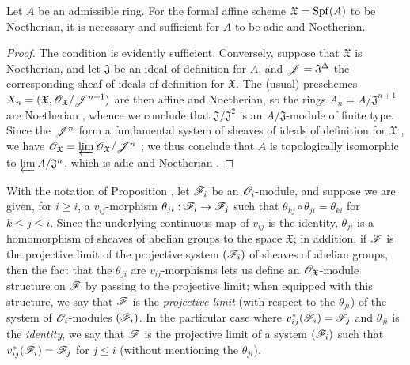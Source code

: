 \begin{corollary}[10.6.5]
\label{I.10.6.5}
Let $A$ be an admissible ring.
For the formal affine scheme $\mathfrak{X}=\operatorname{Spf}(A)$ to be Noetherian, it is necessary and sufficient for $A$ to be adic and Noetherian.
\end{corollary}

\begin{proof}
The condition is evidently sufficient.
Conversely, suppose that $\mathfrak{X}$ is Noetherian, and let $\mathfrak{J}$ be an ideal of definition for $A$, and $\mathscr{J}=\mathfrak{J}^\Delta$ the corresponding sheaf of ideals of definition for $\mathfrak{X}$.
The (usual) preschemes $X_n=(\mathfrak{X},\mathscr{O}_\mathfrak{X}/\mathscr{J}^{n+1})$ are then affine and Noetherian, so the rings $A_n=A/\mathfrak{J}^{n+1}$ are Noetherian , whence we conclude that $\mathfrak{J}/\mathfrak{J}^2$ is an $A/\mathfrak{J}$-module of finite type.
Since the $\mathscr{J}^n$ form a fundamental system of sheaves of ideals of definition for $\mathfrak{X}$ , we have $\mathscr{O}_\mathfrak{X}=\varprojlim\mathscr{O}_\mathfrak{X}/\mathscr{J}^n$ ; we thus conclude  that $A$ is topologically isomorphic to $\varprojlim A/\mathfrak{J}^n$, which is adic and Noetherian .
\end{proof}

\begin{remark}[10.6.6]
\label{I.10.6.6}
With the notation of Proposition , let $\mathscr{F}_i$ be an $\mathscr{O}_i$-module, and suppose we are given, for $i\geq i$, a $v_{ij}$-morphism $\theta_{ji}:\sh{F}_i\to\sh{F}_j$ such that $\theta_{kj}\circ\theta_{ji}=\theta_{ki}$ for $k\leq j\leq i$.
Since the underlying continuous map of $v_{ij}$ is the identity, $\theta_{ji}$ is a homomorphism of sheaves of abelian groups to the space $\mathfrak{X}$; in addition, if $\mathscr{F}$ is the projective limit of the projective system $(\mathscr{F}_i)$ of sheaves of abelian groups, then the fact that the $\theta_{ji}$ are $v_{ij}$-morphisms lets us define an $\mathscr{O}_\mathfrak{X}$-module structure on $\mathscr{F}$ by passing to the projective limit; when equipped with this structure, we say that $\mathscr{F}$ is the \emph{projective limit} (with respect to the $\theta_{ji}$) of the system of $\mathscr{O}_i$-modules $(\mathscr{F}_i)$.
In the particular case where $v_{ij}^*(\mathscr{F}_i)=\mathscr{F}_j$ and $\theta_{ji}$ is the \emph{identity}, we say that $\mathscr{F}$ is the projective limit of a system $(\mathscr{F}_i)$ such that $v_{ij}^*(\mathscr{F}_i)=\mathscr{F}_j$ for $j\leq i$ (without mentioning the $\theta_{ji}$).
\end{remark}

